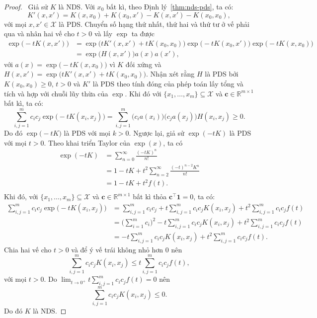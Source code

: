 \begin{proof}\elaborate\
  Giả sử $K$ là NDS. Với $x_0$ bất kì, theo Định lý~\ref{thm:nds-pds}, ta có:
  \begin{equation}
    K'(x, x') = K(x, x_0) + K(x_0, x') - K(x, x') - K(x_0, x_0),
  \end{equation}với mọi $x, x' \in \mathcal{X}$ là PDS. Chuyển số hạng thứ
  nhất, thứ hai và thứ tư ở vế phải qua và nhân hai vế cho $t>0$ và lấy $\exp$
  ta được \begin{align}
    \exp\bigl(-tK(x, x')\bigr) &= \exp\bigl(tK'(x, x') + tK(x_0, x_0)\bigr)
    \exp\bigl(-tK(x_0, x')\bigr) \exp\bigl(-tK(x, x_0)\bigr) \\
    &= \exp\bigl(H(x, x')\bigr)a(x)a(x'),
  \end{align}với $a(x) = \exp\bigl(-tK(x, x_0)\bigr)$ vì $K$ đối xứng và
  $H(x, x') = \exp\bigl(tK'(x, x') + tK(x_0, x_0)\bigr)$. Nhận xét rằng $H$ là
  PDS bởi $K(x_0, x_0) \ge 0$, $t>0$ và $K'$ là PDS theo tính đóng của phép
  toán lấy  tổng và tích và hợp với chuỗi lũy thừa của $\exp$. Khi đó với
  $\{x_1, \dots, x_m\} \subseteq \mathcal{X}$ và $\mathbf{c} \in \mathbb{R}^{m
  \times 1}$ bất kì, ta có: \begin{equation}
    \sum_{i, j = 1}^mc_ic_j\exp\bigl( -tK(x_i, x_j)\bigr ) = \sum_{i, j = 1}^m
    \bigl(c_ia(x_i)\bigr) \bigl(c_ja(x_j)\bigr) H(x_i, x_j) \ge 0.
  \end{equation}Do đó $\exp\bigl(-tK)$ là PDS với mọi $k > 0$. Ngược lại, giả
  sử $\exp(-tK)$ là PDS với mọi $t > 0$. Theo khai triển Taylor của
  $\exp(x)$, ta có \begin{align}
    \exp(-tK) &= \sum_{n = 0}^\infty \frac{(-tK)^n}{n!} \\
    &= 1 - tK + t^2\sum_{n = 2}^\infty \frac{(-t)^{n-2}K^n}{n!} \\
    &= 1 - tK + t^2f(t).\\
  \end{align}Khi đó, với $\{x_1,\dots, x_m\} \subseteq \mathcal{X}$ và
  $\mathbf{c} \in \mathbb{R}^{m \times 1}$ bất kì thỏa $\mathbf{c}^\intercal
  \mathbf{1} = 0$, ta có: \begin{align}
    \sum_{i, j = 1}^m c_ic_j\exp\bigl( -tK(x_i, x_j)\bigr ) &= \sum_{i, j =
    1}^m c_ic_j + t\sum_{i, j = 1}^mc_ic_jK(x_i, x_j) + t^2\sum_{i, j = 1}^m
    c_ic_jf(t) \\
    &= \biggl( \sum_{i = 1}^m c_i \biggr )^2 - t\sum_{i, j = 1}^mc_ic_jK(x_i,
    x_j) + t^2\sum_{i, j = 1}^m c_ic_jf(t) \\
    &= - t\sum_{i, j = 1}^mc_ic_jK(x_i, x_j) + t^2\sum_{i, j = 1}^m c_ic_jf(t).
  \end{align} Chia hai vế cho $t>0$ và để ý vế trái không nhỏ hơn 0 nên
  \begin{equation}
    \sum_{i, j = 1}^mc_ic_jK(x_i, x_j) \le t\sum_{i, j = 1}^m c_ic_jf(t),
  \end{equation}với mọi $t > 0$. Do $\lim_{t\to0^+} t\sum_{i, j = 1}^m
  c_ic_jf(t) = 0$ nên \begin{equation}
    \sum_{i, j = 1}^m c_ic_j K(x_i, x_j) \le 0.
  \end{equation} Do đó $K$ là NDS.
\end{proof}

